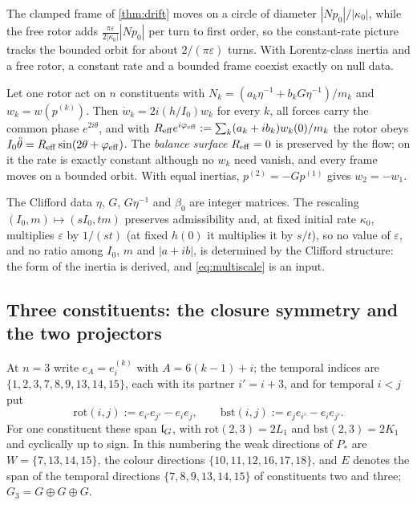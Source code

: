 The clamped frame of \cref{thm:drift} moves on a circle of diameter $|Np_0|/|\kappa_0|$, while the free rotor adds $\tfrac{\pi\varepsilon}{2|\kappa_0|}|Np_0|$
per turn to first order, so the constant-rate picture tracks the bounded orbit for about $2/(\pi\varepsilon)$ turns. With Lorentz-class inertia and a
free rotor, a constant rate and a bounded frame coexist exactly on null data.

\begin{proposition}
\label{prop:several}
Let one rotor act on $n$ constituents with $N_k=(a_k\eta^{-1}+b_kG\eta^{-1})/m_k$ and $w_k=w(p^{(k)})$. Then $\dot w_k=2i(h/I_0)w_k$ for every $k$, all
forces carry the common phase $e^{2i\theta}$, and with $R_{\rm eff}e^{i\varphi_{\rm eff}}:=\sum_k(a_k+ib_k)w_k(0)/m_k$ the rotor obeys
$I_0\ddot\theta=R_{\rm eff}\sin(2\theta+\varphi_{\rm eff})$. The \emph{balance surface} $R_{\rm eff}=0$ is preserved by the flow; on it the rate is exactly
constant although no $w_k$ need vanish, and every frame moves on a bounded orbit. With equal inertias, $p^{(2)}=-Gp^{(1)}$ gives $w_2=-w_1$.
\end{proposition}

The Clifford data $\eta$, $G$, $G\eta^{-1}$ and $\beta_0$ are integer matrices. The rescaling $(I_0,m)\mapsto(sI_0,tm)$ preserves admissibility and,
at fixed initial rate $\kappa_0$, multiplies $\varepsilon$ by $1/(st)$ (at fixed $h(0)$ it multiplies it by $s/t$), so no value of $\varepsilon$, and no ratio among $I_0$, $m$ and $|a+ib|$, is determined by the Clifford structure:
the form of the inertia is derived, and \eqref{eq:multiscale} is an input.

\subsection{Three constituents: the closure symmetry and the two projectors}

At $n=3$ write $e_A=e^{(k)}_i$ with $A=6(k-1)+i$; the temporal indices are $\{1,2,3,7,8,9,13,14,15\}$, each with its partner $i'=i+3$, and for
temporal $i<j$ put
\[
\mathrm{rot}(i,j):=e_{i'}e_{j'}-e_ie_j,\qquad \mathrm{bst}(i,j):=e_je_{i'}-e_ie_{j'} .
\]
For one constituent these span $\mathfrak l_G$, with $\mathrm{rot}(2,3)=2L_1$ and $\mathrm{bst}(2,3)=2K_1$ and cyclically up to sign. In this numbering the
weak directions of $P_*$ are $W=\{7,13,14,15\}$, the colour directions $\{10,11,12,16,17,18\}$, and $E$ denotes the span of the temporal directions
$\{7,8,9,13,14,15\}$ of constituents two and three; $G_3=G\oplus G\oplus G$.

